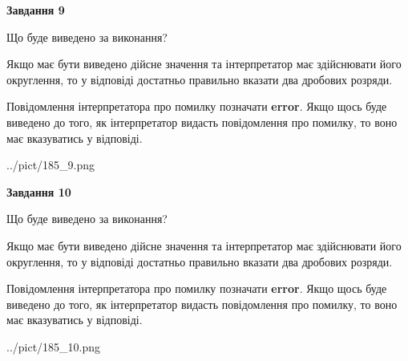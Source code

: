 \documentclass[12pt, ukrainian]{article}
\begin{document}
{\begin {Large}
{\begin {center}\textbf{Завдання 9}\end {center}}\par
Що буде виведено за виконання? \par

Якщо має бути виведено дійсне значення та інтерпретатор має здійснювати його округлення, 
то у відповіді достатньо правильно вказати два дробових розряди.

Повідомлення інтерпретатора про помилку позначати \textbf{error}.
Якщо щось буде виведено до того, як інтерпретатор видасть повідомлення про помилку, 
то воно має вказуватись у відповіді. \par

\begin{center}
	{../pict/185_9.png}
\end{center}
\newpage

{\begin {center}\textbf{Завдання 10}\end {center}}\par
Що буде виведено за виконання? \par

Якщо має бути виведено дійсне значення та інтерпретатор має здійснювати його округлення, 
то у відповіді достатньо правильно вказати два дробових розряди.

Повідомлення інтерпретатора про помилку позначати \textbf{error}.
Якщо щось буде виведено до того, як інтерпретатор видасть повідомлення про помилку, 
то воно має вказуватись у відповіді. \par

\begin{center}
	{../pict/185_10.png}
\end{center}
\newpage

\end {Large}}
\end{document}
